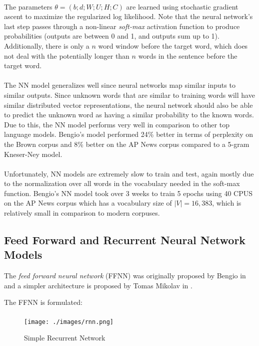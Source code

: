 \documentclass[12pt]{ociamthesis}
\begin{document}
\paragraph{}
The parameters $\theta = (b;d;W;U;H;C)$ are learned using stochastic gradient ascent to maximize the regularized log likelihood. Note that the neural network's last step passes through a non-linear \emph{soft-max} activation function to produce probabilities (outputs are between 0 and 1, and outputs sum up to 1). Additionally, there is only a $n$ word window before the target word, which does not deal with the potentially longer than $n$ words in the sentence before the target word.
\paragraph{}
The NN model generalizes well since neural networks map similar inputs to similar outputs. Since unknown words that are similar to training words will have similar distributed vector representations, the neural network should also be able to predict the unknown word as having a similar probability to the known words.  Due to this, the NN model performs very well in comparison to other top language models. Bengio's model performed 24\% better in terms of perplexity on the Brown corpus and 8\% better on the AP News corpus compared to a 5-gram Kneser-Ney model.
\paragraph{}
Unfortunately, NN models are extremely slow to train and test, again mostly due to the normalization over all words in the vocabulary needed in the soft-max function. Bengio's NN model took over 3 weeks to train 5 epochs using 40 CPUS on the AP News corpus which has a vocabulary size of $|V|=16,383$, which is relatively small in comparison to modern corpuses.

\subsection{Feed Forward and Recurrent Neural Network Models}
The \emph{feed forward neural network} (FFNN) was originally proposed by Bengio in \cite{Bengio2003} and  a simpler architecture is proposed by Tomas Mikolav in \cite{Mikolov2009}.


The FFNN is formulated:
\begin{align}
\end{align}

\begin{figure}
\centering
\texttt{[image: ./images/rnn.png]}
\caption{Simple Recurrent Network}
\label{fig:awesome_image}
\end{figure}
\end{document}
